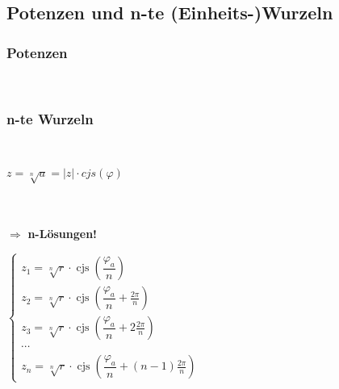 \subsection{Potenzen und n-te (Einheits-)Wurzeln}
	\subsubsection{Potenzen}
		\begin{minipage}[c]{0.5\textwidth}
			\\[12pt]
		\end{minipage}
		\begin{minipage}[c]{0.5\textwidth}
			\scalebox{0.8}{}
		\end{minipage}
		
	\subsubsection{n-te Wurzeln}
		\\[1pt]
		\begin{minipage}[c]{0.2\textwidth}
			$z = \sqrt[n]{a} = \left| z \right| \cdot cjs(\varphi)$\\[3pt]
			\\[3pt]
			\\[3pt]
		\end{minipage}
		\begin{minipage}[c]{0.2\textwidth}
			$\Rightarrow$ \textbf{n-Lösungen!}
		\end{minipage}
		\begin{minipage}[c]{0.3\textwidth}
			$\left\{
				\begin{array}{l}
					z_{1}=\sqrt[n]{r} \cdot \operatorname{cjs}\left(\dfrac{\varphi_{a}}{n}\right) \\[6pt] 
					z_{2}=\sqrt[n]{r} \cdot \operatorname{cjs}\left(\dfrac{\varphi_{a}}{n}+\frac{2 \pi}{n}\right) \\[6pt]
					z_{3}=\sqrt[n]{r} \cdot \operatorname{cjs}\left(\dfrac{\varphi_{a}}{n}+2 \frac{2 \pi}{n}\right) \\[6pt]
					\cdots \\ 
					z_{n}=\sqrt[n]{r} \cdot \operatorname{cjs}\left(\dfrac{\varphi_{a}}{n}+(n-1) \frac{2 \pi}{n}\right)
				\end{array}
			\right.$
		\end{minipage}
		\begin{minipage}[c]{0.2\textwidth}
			\scalebox{0.65}{}
		\end{minipage}
	
